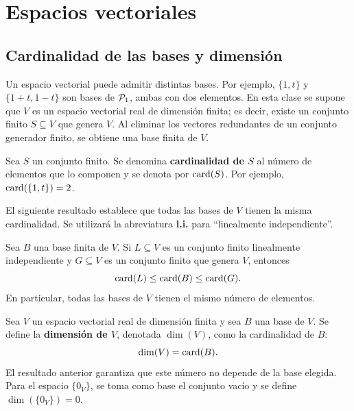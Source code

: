 \documentclass[compacto,10pt]{pubciencias-notas}
\begin{document}
\encabezado
\vspace*{-8mm}
\setcounter{section}{3}
\section{Espacios vectoriales}
\subsection{Cardinalidad de las bases y dimensión}

Un espacio vectorial puede admitir distintas bases. Por ejemplo,
$\{1,t\}$ y $\{1+t,1-t\}$ son bases de $\mathcal{P}_1$, ambas con dos elementos.
En esta clase se supone que $V$ es un espacio vectorial real de dimensión
finita; es decir, existe un conjunto finito $S\subseteq V$ que genera $V$.
Al eliminar los vectores redundantes de un conjunto generador finito,
se obtiene una base finita de $V$.

\begin{defi}[Cardinalidad]
    Sea $S$ un conjunto finito. Se denomina \textbf{cardinalidad de $S$}
    al número de elementos que lo componen y se denota por $\operatorname{card}(S)$.
    Por ejemplo, $\operatorname{card}(\{1,t\})=2$.
\end{defi}

El siguiente resultado establece que todas las bases
de $V$ tienen la misma cardinalidad. Se utilizará la abreviatura
\textbf{l.i.} para ``linealmente independiente''.

\begin{teo}\label{sem10cl02:cardinalidad}
    Sea $B$ una base finita de $V$. Si $L\subseteq V$ es un conjunto
    finito linealmente independiente y $G\subseteq V$ es un conjunto finito que genera $V$,
    entonces
    \[
        \operatorname{card}(L)\le\operatorname{card}(B)\le\operatorname{card}(G).
    \]
    En particular, todas las bases de $V$ tienen el mismo número de elementos.
\end{teo}

\begin{defi}[Dimensión]\label{sem10cl02:dimension}
    Sea $V$ un espacio vectorial real de dimensión finita y sea $B$ una base de $V$.
    Se define la \textbf{dimensión de $V$}, denotada $\dim(V)$, como
    la cardinalidad de $B$:
    \[
        \dim(V)=\operatorname{card}(B).
    \]
    El resultado anterior garantiza que este número no depende de la
    base elegida. Para el espacio $\{0_V\}$, se toma como base el conjunto
    vacío y se define $\dim(\{0_V\})=0$.
\end{defi}
\end{document}
